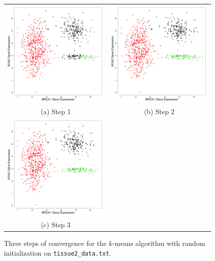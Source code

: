 \documentclass[11pt]{article}
\begin{document}
\begin{figure}
\begin{tabular}{c c}
    \includegraphics[width=65mm]{../tissue2random_plots/cluster_step1.png} & 
    \includegraphics[width=65mm]{../tissue2random_plots/cluster_step2.png} \\
    (a) Step 1 & (b) Step 2 \\
    \includegraphics[width=65mm]{../tissue2random_plots/cluster_step3.png} & \\
    (c) Step 3 & \\
\end{tabular}
\caption{Three steps of convergence for the $k$-means algorithm 
with random initialization on {\tt tissue2\_data.txt}.}
\end{figure}
\end{document}

